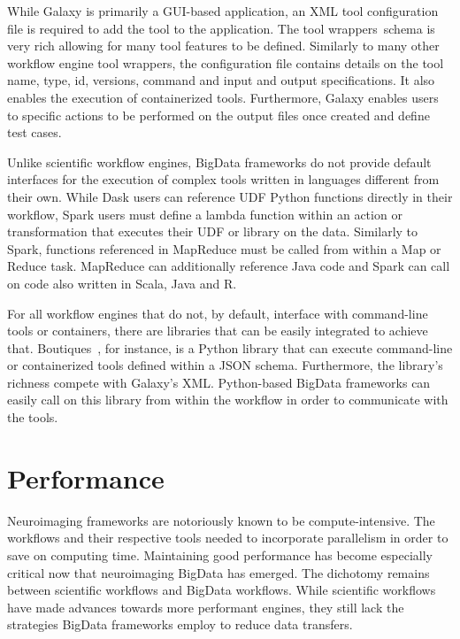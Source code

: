 \documentclass{report}
\begin{document}
            While Galaxy is primarily a GUI-based application, an XML tool
            configuration file is required to add the tool to the application.
            The tool wrappers\ schema is very rich allowing for many tool 
            features to be defined. Similarly to many other workflow engine tool
            wrappers, the configuration file contains details on the tool name, 
            type, id, versions, command and input and output specifications. It
            also enables the execution of containerized tools. Furthermore,
            Galaxy enables users to specific actions to be performed on the 
            output files once created and define test cases.

            Unlike scientific workflow engines, BigData frameworks do not 
            provide default interfaces for the execution of complex tools 
            written in 
            languages different from their own. While Dask users can reference
            UDF Python functions directly in their workflow, Spark users
            must define a lambda function within an action or transformation 
            that executes their UDF or library on the data. Similarly to Spark,
            functions referenced in MapReduce must be called from within a Map
            or Reduce task. MapReduce can additionally reference Java 
            code and Spark can call on code also written in Scala, Java and R.

            For all workflow engines that do not, by default, interface with 
            command-line tools or containers, there are libraries that can be
            easily integrated to achieve that. 
            Boutiques~\cite{doi:10.1093/gigascience/giy016}, for instance, is a 
            Python library that can execute command-line or containerized tools
            defined within a JSON schema. Furthermore, the library's richness
            compete with Galaxy's XML. Python-based BigData frameworks can 
            easily call on this library from within the workflow in order to
            communicate with the tools.

            
    \chapter{Performance}\label{performance}
        Neuroimaging frameworks are notoriously known to be compute-intensive.
        The workflows and their respective tools needed to incorporate 
        parallelism in order to save on computing time. Maintaining good 
        performance has become especially critical now that neuroimaging
        BigData has emerged. The dichotomy remains between scientific 
        workflows and BigData workflows. While scientific workflows have made
        advances towards more performant engines, they still lack the 
        strategies BigData frameworks employ to reduce data transfers. 
        
\end{document}
